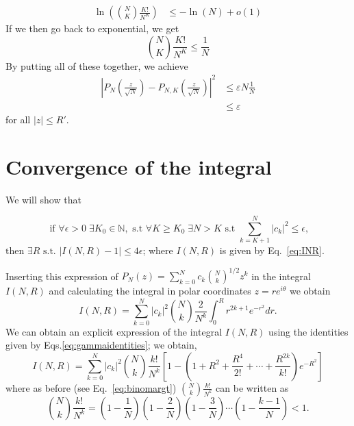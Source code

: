 \documentclass[aps,prl,showpacs,twocolumn]{revtex4-2}
\providecommand{\abs}[1]{\left\lvert#1\right\rvert}
\providecommand{\be}{\begin{equation}}
\providecommand{\ee}{\end{equation}}
\providecommand{\abs}[1]{\left\lvert#1\right\rvert}
\providecommand{\be}{\begin{equation}}
\providecommand{\ee}{\end{equation}}
\providecommand{\abs}[1]{\left\lvert#1\right\rvert}
\providecommand{\be}{\begin{equation}}
\providecommand{\ee}{\end{equation}}
\providecommand{\abs}[1]{\left\lvert#1\right\rvert}
\providecommand{\be}{\begin{equation}}
\providecommand{\ee}{\end{equation}}
\begin{document}
\begin{align*}
    \ln \left( \binom{N}{K} \frac{K!}{N^K} \right) &\leq - \ln(N) + o(1)
\end{align*}
If we then go back to exponential, we get
\[ \binom{N}{K} \frac{K!}{N^K} \leq \frac{1}{N} \]
By putting all of these together, we achieve
\begin{align*}
    \left| P_N \left( \frac{z}{\sqrt{N}} \right) - P_{N,K} \left( \frac{z}{\sqrt{N}} \right) \right|^2
    &\leq \varepsilon N \frac{1}{N}\\
    &\leq \varepsilon
\end{align*}
for all $|z| \leq R'$.





\section{Convergence of the integral}

We will show that

\be
\text{ if } \forall \epsilon>0 \; \exists K_0 \in \mathbb{N}, \text{ s.t } \forall K\geq K_0 \; \exists N > K  \text{ s.t } \sum_{k=K+1}^N \abs{c_k}^2\leq \epsilon,
\ee
$\text{then } \exists R \text{ s.t. }   \abs{I(N,R) -1} \le 4\epsilon$; where $I(N,R)$ is given by Eq.~\eqref{eq:INR}.

Inserting this expression of  $P_N(z)= \sum_{k=0}^N c_k \binom{N}{k}^{1/2} z^k$ in
the integral $I(N,R)$ and calculating the integral in polar coordinates  $z=re^{i\theta}$ we obtain
\[
I(N,R) = \sum_{k=0}^{N} \abs{c_k}^2 \binom{N}{k}\frac{2}{N^k} \int_{0}^{R}
r^{2k+1} e^{-r^2} dr.
\]
We can obtain an explicit expression of the integral $I(N,R)$ using the identities given by Eqs.\eqref{eq:gammaidentities};
we obtain,
\[
I(N,R) = \sum_{k=0}^N \abs{c_k}^2\binom{N}{k}\frac{k!}{N^k}
\left[1 -\left(1+R^2+\frac{R^4}{2!} +  \cdots +  \frac{R^{2k}}{k!} \right) e^{-R^2} \right]
\]
where as before (see Eq.~\eqref{eq:binomargt}) $\binom{N}{k}\frac{k!}{N^k}$ can be written as
\[

\binom{N}{k}\frac{k!}{N^k} = \left(1-\frac{1}{N}\right)\left(1-\frac{2}{N}\right)\left(1-\frac{3}{N}\right)\cdots \left(1-\frac{k-1}{N}\right) <1.
\]
\end{document}
